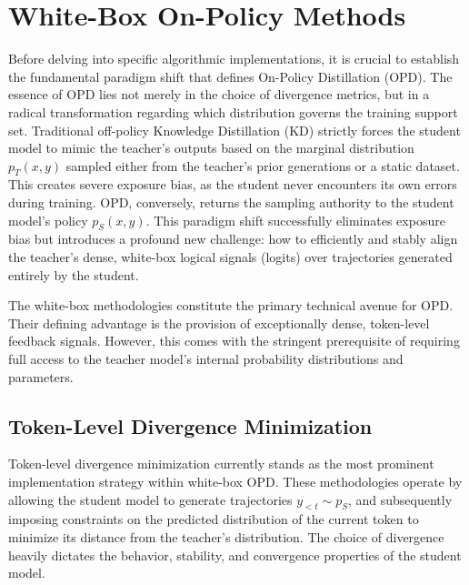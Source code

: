 \documentclass{article} %
\begin{document}
\section{White-Box On-Policy Methods}
\label{sec:white_box}

Before delving into specific algorithmic implementations, it is crucial to establish the fundamental paradigm shift that defines On-Policy Distillation (OPD). The essence of OPD lies not merely in the choice of divergence metrics, but in a radical transformation regarding which distribution governs the training support set. Traditional off-policy Knowledge Distillation (KD) strictly forces the student model to mimic the teacher's outputs based on the marginal distribution $p_T(x, y)$ sampled either from the teacher's prior generations or a static dataset. This creates severe exposure bias, as the student never encounters its own errors during training. OPD, conversely, returns the sampling authority to the student model's policy $p_S(x, y)$. This paradigm shift successfully eliminates exposure bias but introduces a profound new challenge: how to efficiently and stably align the teacher's dense, white-box logical signals (logits) over trajectories generated entirely by the student. 

The white-box methodologies constitute the primary technical avenue for OPD. Their defining advantage is the provision of exceptionally dense, token-level feedback signals. However, this comes with the stringent prerequisite of requiring full access to the teacher model's internal probability distributions and parameters.

\subsection{Token-Level Divergence Minimization}
\label{subsec:token_level}

Token-level divergence minimization currently stands as the most prominent implementation strategy within white-box OPD. These methodologies operate by allowing the student model to generate trajectories $y_{<t} \sim p_S$, and subsequently imposing constraints on the predicted distribution of the current token to minimize its distance from the teacher's distribution. The choice of divergence heavily dictates the behavior, stability, and convergence properties of the student model.
\end{document}
